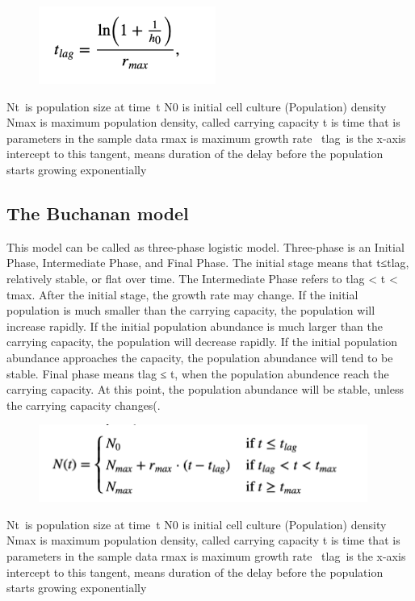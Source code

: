 \documentclass[11pt,a4 paper,title page]{article}
\begin{document}
\begin{figure}[H]
\centering
\includegraphics[height=1in,angle=360]{../picture/figure5.png}
\end{figure}
    \hfill\break
Nt is population size at time t
    \hfill\break
N0 is initial cell culture (Population) density
    \hfill\break
Nmax is maximum population density, called carrying capacity
    \hfill\break
t is time that is parameters in the sample data
    \hfill\break
rmax is maximum growth rate 
    \hfill\break
tlag is the x-axis intercept to this tangent, means duration of the delay
    \hfill\break
before the population starts growing exponentially

    \subsection{The Buchanan model}
    This model can be called as three-phase logistic model. Three-phase is an Initial Phase, Intermediate Phase, and Final Phase. The initial stage means that t≤tlag, relatively stable, or flat over time. The Intermediate Phase refers to tlag < t < tmax. After the initial stage, the growth rate may change. If the initial population is much smaller than the carrying capacity, the population will increase rapidly. If the initial population abundance is much larger than the carrying capacity, the population will decrease rapidly. If the initial population abundance approaches the capacity, the population abundance will tend to be stable. Final phase means tlag ≤ t, when the population abundence reach the carrying capacity. At this point, the population abundance will be stable, unless the carrying capacity changes(\cite{lopez2004statistical}.
\begin{figure}[H]
\centering
\includegraphics[height=1in,angle=360]{../picture/figure6.png}
\end{figure}
    \hfill\break
    Nt is population size at time t
    \hfill\break
N0 is initial cell culture (Population) density
\hfill\break
Nmax is maximum population density, called carrying capacity
\hfill\break
t is time that is parameters in the sample data
\hfill\break
rmax is maximum growth rate 
\hfill\break
tlag is the x-axis intercept to this tangent, means duration of the delay before the population starts growing exponentially
\end{document}
